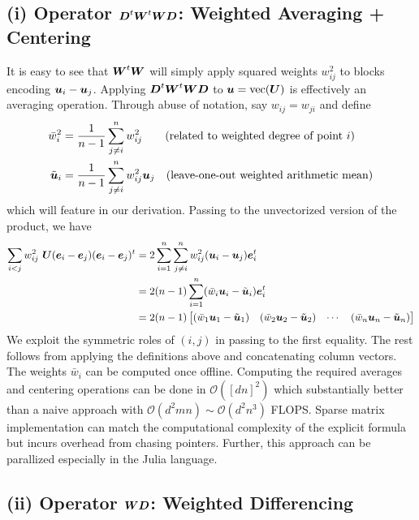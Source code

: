 \documentclass[11pt]{article}
\begin{document}
\subsection*{(i) Operator \(\boldsymbol{D}^{t} \boldsymbol{W}^{t} \boldsymbol{W} \boldsymbol{D}\): Weighted Averaging + Centering}

It is easy to see that \(\boldsymbol{W}^{t} \boldsymbol{W}\) will simply apply squared weights \(w_{ij}^{2}\) to blocks encoding \(\boldsymbol{u}_{i} - \boldsymbol{u}_{j}\).
Applying \(\boldsymbol{D}^{t} \boldsymbol{W}^{t} \boldsymbol{W} \boldsymbol{D}\) to \(\boldsymbol{u} = \mathop{\rm vec}\nolimits(\boldsymbol{U})\) is effectively an averaging operation.
Through abuse of notation, say \(w_{ij} = w_{ji}\) and define
\begin{align*}
    \bar{w}_{i}^{2}
    &=
    \frac{1}{n-1} \sum_{j \neq i}^{n} w_{ij}^{2}
    \qquad
    \text{(related to weighted degree of point \(i\))} \\
    \tilde{\boldsymbol{u}}_{i}
    &=
    \frac{1}{n-1} \sum_{j \neq i}^{n} w_{ij}^{2} \boldsymbol{u}_{j}
    \quad
    \text{(leave-one-out weighted arithmetic mean)}
\end{align*}
which will feature in our derivation.
Passing to the unvectorized version of the product, we have
\begin{align*}
    \sum_{i < j} w_{ij}^{2}~\boldsymbol{U} (\boldsymbol{e}_{i} - \boldsymbol{e}_{j}) (\boldsymbol{e}_{i} - \boldsymbol{e}_{j})^{t}
    &=
    2 \sum_{i=1}^{n} \sum_{j \neq i}^{n} w_{ij}^{2} (\boldsymbol{u}_{i} - \boldsymbol{u}_{j}) \boldsymbol{e}_{i}^{t} \\
    &=
    2 (n-1) \sum_{i=1}^{n} (\bar{w}_{i} \boldsymbol{u}_{i} - \tilde{\boldsymbol{u}}_{i}) \boldsymbol{e}_{i}^{t} \\
    &=
    2 (n-1) \begin{bmatrix}
        (\bar{w}_{1} \boldsymbol{u}_{1} - \tilde{\boldsymbol{u}}_{1})
        & (\bar{w}_{2} \boldsymbol{u}_{2} - \tilde{\boldsymbol{u}}_{2})
        & \cdots
        & (\bar{w}_{n} \boldsymbol{u}_{n} - \tilde{\boldsymbol{u}}_{n})
    \end{bmatrix}
\end{align*}
We exploit the symmetric roles of \((i,j)\) in passing to the first equality.
The rest follows from applying the definitions above and concatenating column vectors.
The weights \(\bar{w}_{i}\) can be computed once offline.
Computing the required averages and centering operations can be done in \(\mathcal{O}([dn]^{2})\) which substantially better than a naive approach with \(\mathcal{O}(d^{2}mn) \sim \mathcal{O}(d^{2}n^{3})\) FLOPS.
Sparse matrix implementation can match the computational complexity of the explicit formula but incurs overhead from chasing pointers.
Further, this approach can be parallized especially in the Julia language.

\subsection*{(ii) Operator \(\boldsymbol{W} \boldsymbol{D}\): Weighted Differencing}
\end{document}
